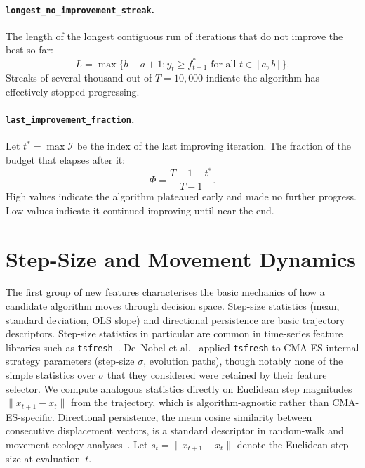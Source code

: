 \paragraph{\texttt{longest\_no\_improvement\_streak}.}
The length of the longest contiguous run of iterations that do not improve the best-so-far:
\begin{equation}
\label{eq:longest_no_imp}
  L = \max \bigl\{b - a + 1 : y_t \ge f^*_{t-1} \text{ for all } t \in [a, b]\bigr\}.
\end{equation}
Streaks of several thousand out of $T = 10{,}000$ indicate the algorithm has effectively stopped progressing.

\paragraph{\texttt{last\_improvement\_fraction}.}
Let $t^* = \max \mathcal{I}$ be the index of the last improving iteration. The fraction of the budget that elapses after it:
\begin{equation}
\label{eq:last_imp_frac}
  \Phi = \frac{T - 1 - t^*}{T - 1}.
\end{equation}
High values indicate the algorithm plateaued early and made no further progress. Low values indicate it continued improving until near the end.

\section{Step-Size and Movement Dynamics}
\label{sec:features:stepsize}

The first group of new features characterises the basic mechanics of how
a candidate algorithm moves through decision space.  Step-size statistics
(mean, standard deviation, OLS slope) and directional persistence are
basic trajectory descriptors.  Step-size statistics in particular are
common in time-series feature libraries such as
\texttt{tsfresh}~\cite{christ2018tsfresh}. De~Nobel et
al.~\cite{deNobel2021tsfresh} applied \texttt{tsfresh} to CMA-ES internal
strategy parameters (step-size $\sigma$, evolution paths), though
notably none of the simple statistics over $\sigma$ that they considered
were retained by their feature selector.  We compute analogous statistics
directly on Euclidean step magnitudes $\lVert x_{t+1} - x_t \rVert$ from
the trajectory, which is algorithm-agnostic rather than CMA-ES-specific.
Directional persistence, the mean cosine similarity between consecutive
displacement vectors, is a standard descriptor in random-walk and
movement-ecology analyses~\cite{codling2008randomwalk}.  Let
$s_t = \lVert x_{t+1} - x_t \rVert$ denote the Euclidean step size at
evaluation~$t$.


